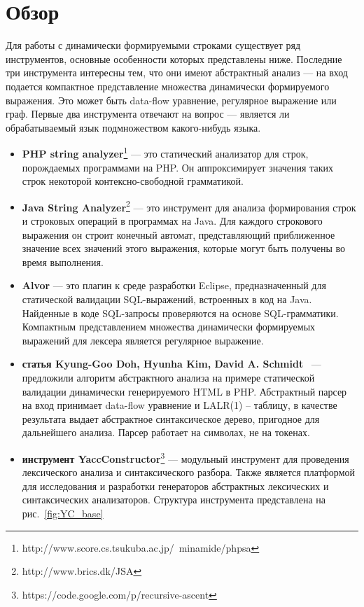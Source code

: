 \section{Обзор}
Для работы с динамически формируемыми строками существует ряд инструментов, основные особенности которых представлены ниже. 
Последние три инструмента интересны тем, что они имеют абстрактный анализ --- на вход подается компактное представление множества 
динамически формируемого выражения. Это может быть data-flow уравнение, регулярное выражение или граф. Первые два инструмента отвечают 
на вопрос --- является ли обрабатываемый язык подмножеством какого-нибудь языка. 
\begin{itemize}
\item \textbf{PHP string analyzer}\footnote{http://www.score.cs.tsukuba.ac.jp/~minamide/phpsa} --- это статический анализатор для строк, порождаемых программами на PHP. Он аппроксимирует значения 
таких строк некоторой контексно-свободной грамматикой.
\item \textbf{Java String Analyzer}\footnote{http://www.brics.dk/JSA} --- это инструмент для анализа формирования строк и строковых операций в программах на Java. 
Для каждого строкового выражения он строит конечный автомат, представляющий приближенное значение всех значений этого выражения, 
которые могут быть получены во время выполнения.
\item \textbf{Alvor} --- это плагин к среде разработки Eclipse, предназначенный для статической валидации SQL-выражений, встроенных в код на Java. 
Найденные в коде  SQL-запросы проверяются на основе SQL-грамматики.  Компактным представлением множества динамически формируемых выражений для лексера 
является регулярное выражение.
\item \textbf{статья Kyung-Goo Doh, Hyunha Kim, David A. Schmidt}~\cite{Doh} --- предложили алгоритм абстрактного анализа на примере статической 
валидации  динамически генерируемого HTML в PHP. Абстрактный парсер на вход принимает data-flow уравнение и LALR(1) -- таблицу, в качестве результата 
выдает абстрактное синтаксическое дерево, пригодное для дальнейшего анализа. Парсер работает на символах, не на токенах. 
\item \textbf{инструмент YaccConstructor}\footnote{https://code.google.com/p/recursive-ascent} --- модульный инструмент для проведения лексического  
анализа и синтаксического разбора. Также является платформой для исследования и разработки генераторов абстрактных лексических и синтаксических анализаторов.
Структура инструмента представлена на рис.~\ref{fig:YC_base}


\end{itemize}
